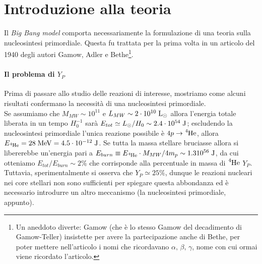 \section{Introduzione alla teoria}
Il \textit{Big Bang model} comporta necessariamente la formulazione di una teoria sulla nucleosintesi primordiale. Questa fu trattata per la prima volta in un articolo del 1940 degli autori Gamow, Adler e Bethe\footnote{Un aneddoto diverte: Gamow (che è lo stesso Gamow del decadimento di Gamow-Teller) insistette per avere la partecipazione anche di Bethe, per poter mettere nell'articolo i nomi  che ricordavano $\alpha,\,\beta,\,\gamma$, nome con cui ormai viene ricordato l'articolo.}.

\paragraph{Il problema di $Y_P$} Prima di passare allo studio delle reazioni di interesse, mostriamo come alcuni risultati confermano la necessità di una nucleosintesi primordiale.\\
Se assumiamo che $M_{MW} \sim 10^{11}$ \Msol e $L_{MW}\sim 2\cdot 10^{10}\;\mbox{L}_{\odot} {}$ allora l'energia totale liberata in un tempo $H_0^{-1}$ sarà $E_{tot} \simeq L_{\odot}/H_0\sim 2.4\cdot 10^{54}\;\mbox{J}$; escludendo la nucleosintesi primordiale l'unica reazione possibile è $4p\to\ce{^4He}$, allora $E_{\ce{^4He}} = 28\unit{MeV}= 4.5 \cdot \ord{-12}\unit{J}$. Se tutta la massa stellare bruciasse allora si libererebbe un'energia pari a $E_{burn} \equiv E_{\ce{^4He}}\cdot M_{MW}/4m_p\sim 1.3 \ord{56}\unit{J}$, da cui otteniamo $E_{tot}/E_{burn}\sim 2\%$ che corrisponde alla percentuale in massa di $\ce{^4He}$  $Y_P$. Tuttavia, sperimentalmente si osserva che $Y_P\simeq 25\%$, dunque le reazioni nucleari nei core stellari non sono sufficienti per spiegare questa abbondanza ed è necessario introdurre un altro meccanismo (la nucleosintesi primordiale, appunto).

